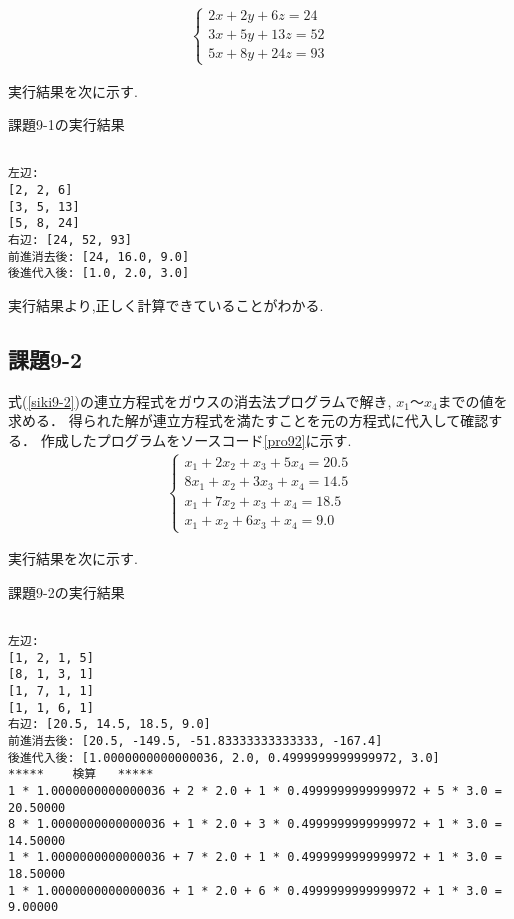 \documentclass[a4j]{jsarticle}
\begin{document}
\begin{eqnarray}
  \begin{cases}
   2x + 2y + 6z = 24\\
   3x + 5y + 13z = 52\\
   5x + 8y + 24z = 93
  \end{cases}
  \label{siki9-1}
\end{eqnarray}



実行結果を次に示す.
\begin{breakitembox}[l]{課題9-1の実行結果}
\begin{verbatim}

左辺:
[2, 2, 6]
[3, 5, 13]
[5, 8, 24]
右辺: [24, 52, 93]
前進消去後: [24, 16.0, 9.0]
後進代入後: [1.0, 2.0, 3.0]
\end{verbatim}
\end{breakitembox}

実行結果より,正しく計算できていることがわかる.

\subsection{課題9-2}
式(\ref{siki9-2})の連立方程式をガウスの消去法プログラムで解き,
$x_1$〜$x_4$までの値を求める．
得られた解が連立方程式を満たすことを元の方程式に代入して確認する．
作成したプログラムをソースコード\ref{pro92}に示す.
\begin{eqnarray}
 \begin{cases}
  x_1  + 2x_2 + x_3  + 5x_4 = 20.5\\
  8x_1 + x_2  + 3x_3 + x_4  = 14.5\\
  x_1  + 7x_2 + x_3  + x_4  = 18.5\\
  x_1  + x_2  + 6x_3 + x_4  = 9.0
 \end{cases}
\label{siki9-2}
\end{eqnarray}



実行結果を次に示す.
\begin{breakitembox}[l]{課題9-2の実行結果}
\begin{verbatim}

左辺:
[1, 2, 1, 5]
[8, 1, 3, 1]
[1, 7, 1, 1]
[1, 1, 6, 1]
右辺: [20.5, 14.5, 18.5, 9.0]
前進消去後: [20.5, -149.5, -51.83333333333333, -167.4]
後進代入後: [1.0000000000000036, 2.0, 0.4999999999999972, 3.0]
*****    検算   *****
1 * 1.0000000000000036 + 2 * 2.0 + 1 * 0.4999999999999972 + 5 * 3.0 = 20.50000
8 * 1.0000000000000036 + 1 * 2.0 + 3 * 0.4999999999999972 + 1 * 3.0 = 14.50000
1 * 1.0000000000000036 + 7 * 2.0 + 1 * 0.4999999999999972 + 1 * 3.0 = 18.50000
1 * 1.0000000000000036 + 1 * 2.0 + 6 * 0.4999999999999972 + 1 * 3.0 = 9.00000
\end{verbatim}
\end{breakitembox}
\end{document}
